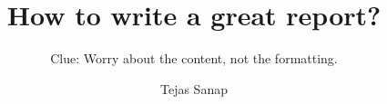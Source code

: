 \documentclass{beamer}
\title{How to write a great report?}
\subtitle{\tiny Clue: Worry about the content, not the formatting.}
\author{Tejas Sanap}
\begin{document}
	\begin{frame}
		\maketitle
	\end{frame}
	
\end{document}
